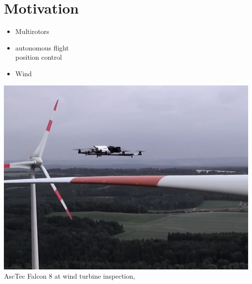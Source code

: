 \ETHslide
\section*{Motivation}
\vspace*{\fill}

\begin{minipage}{0.5\textwidth}
	\begin{itemize}
		\item[\ETHitem] Multirotors
		\item[\ETHitem] autonomous flight \\ position control
		\item[\ETHitem] Wind
\end{itemize}
\end{minipage}
\begin{minipage}{0.49\textwidth}
	\centering
	\includegraphics[width=1\textwidth]{images/mav_wind_turbine.png}\\
	\tiny{AscTec Falcon 8 at wind turbine inspection, \cite{www:asctecinspect}} 
\end{minipage}

\vspace*{\fill}
\clearpage